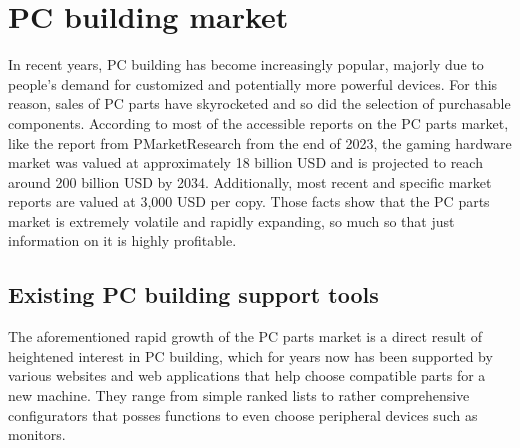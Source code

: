 \section{PC building market}
In recent years, PC building has become increasingly popular, majorly due to people's demand for customized and potentially more powerful devices.
For this reason, sales of PC parts have skyrocketed and so did the selection of purchasable components. 
According to most of the accessible reports on the PC parts market, like the report from PMarketResearch \cite{article} from the end of 2023, the gaming hardware market was valued at approximately 18 billion USD and is projected to reach around 200 billion USD by 2034.
Additionally, most recent and specific market reports are valued at 3,000 USD per copy.
Those facts show that the PC parts market is extremely volatile and rapidly expanding, so much so that just information on it is highly profitable.

\subsection{Existing PC building support tools}
\label{sec:supporttools}
The aforementioned rapid growth of the PC parts market is a direct result of heightened interest in PC building, which for years now has been supported by various websites and web applications that help choose compatible parts for a new machine.
They range from simple ranked lists to rather comprehensive configurators that posses functions to even choose peripheral devices such as monitors.


